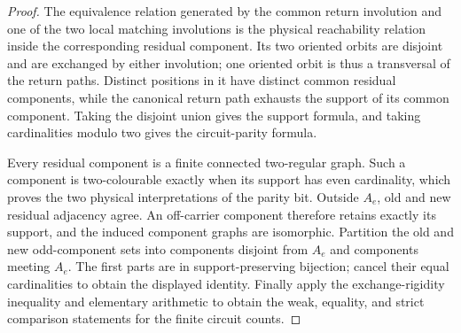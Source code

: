 \begin{proof}
The equivalence relation generated by the common return involution and one
of the two local matching involutions is the physical reachability relation
inside the corresponding residual component.  Its two oriented orbits are
disjoint and are exchanged by either involution; one oriented orbit is thus
a transversal of the return paths.  Distinct positions in it have distinct
common residual components, while the canonical return path exhausts the
support of its common component.  Taking the disjoint union gives the support
formula, and taking cardinalities modulo two gives the circuit-parity
formula.

Every residual component is a finite connected two-regular graph.  Such a
component is two-colourable exactly when its support has even cardinality,
which proves the two physical interpretations of the parity bit.  Outside
\(A_e\), old and new residual adjacency agree.  An off-carrier component
therefore retains exactly its support, and the induced component graphs are
isomorphic.  Partition the old and new odd-component sets into components
disjoint from \(A_e\) and components meeting \(A_e\).  The first parts are
in support-preserving bijection; cancel their equal cardinalities to obtain
the displayed identity.  Finally apply the exchange-rigidity inequality and
elementary arithmetic to obtain the weak, equality, and strict comparison
statements for the finite circuit counts.
\end{proof}

